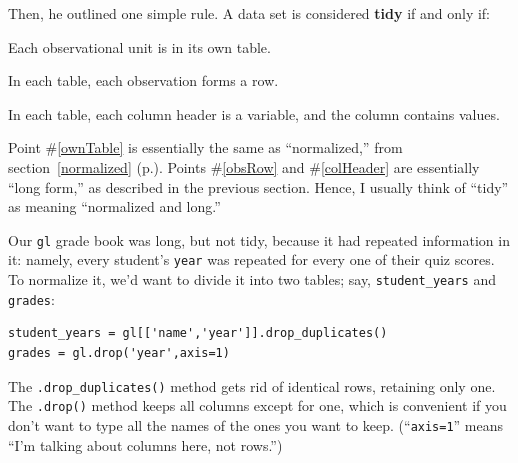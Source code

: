 \pagebreak
{}
Then, he outlined one simple rule. A data set is considered \textbf{tidy} if
and only if:

\begin{shaded}
\begin{compactenum}
\item \label{ownTable} Each observational unit is in its own table.
\item \label{obsRow} In each table, each observation forms a row.
\item \label{colHeader} In each table, each column header is a variable, and
the column contains values.
\end{compactenum}
\end{shaded}

\label{normalized2}

Point \#\ref{ownTable} is essentially the same as ``normalized,'' from
section~\ref{normalized} (p.\pageref{normalized}). Points \#\ref{obsRow} and
\#\ref{colHeader} are essentially ``long form,'' as described in the previous
section. Hence, I usually think of ``tidy'' as meaning ``normalized and long.''

\smallskip
Our \texttt{gl} grade book was long, but not tidy, because it had repeated
information in it: namely, every student's \texttt{year} was repeated for every
one of their quiz scores. To normalize it, we'd want to divide it into two
tables; say, \texttt{student\_years} and \texttt{grades}:


\vspace{-.2in}
\begin{Verbatim}[fontsize=\small,samepage=true,frame=single,framesep=3mm]
student_years = gl[['name','year']].drop_duplicates()
grades = gl.drop('year',axis=1)
\end{Verbatim}
\vspace{-.2in}

The \texttt{.drop\_duplicates()} method gets rid of identical rows, retaining
only one. The \texttt{.drop()} method keeps all columns except for one, which
is convenient if you don't want to type all the names of the ones you want to
keep. (``\texttt{axis=1}'' means ``I'm talking about columns here, not rows.'')

